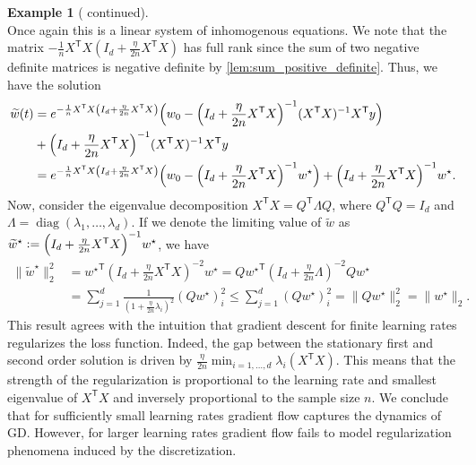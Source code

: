 \documentclass[12pt]{article}
\theoremstyle{definition}
\newtheorem{example}[example]{Example}
\numberwithin{equation}{section}
\newcommand{\T}{\mathsf{T}}
\newcommand{\norm}[1]{\lVert{#1}\rVert_2}
\newcommand{\defeq}{\vcentcolon=}
\DeclareMathOperator{\diag}{diag}
\begin{document}
\begin{example}[ continued]
\begin{equation*}
  \end{equation*}
  Once again this is a linear system of inhomogenous equations. We note that the matrix $-\frac{1}{n}X^\T X \left(I_d + \frac{\eta}{2n}X^\T X\right)$ has full rank since the sum of two negative definite matrices is negative definite by \autoref{lem:sum_positive_definite}. Thus, we have the solution
  \begin{align*}
    \widetilde{w}(t) &= e^{-\frac{1}{n}X^\T X \left(I_d + \frac{\eta}{2n}X^\T X\right)}\Bigl(w_0 - \Bigl(I_d +\frac{\eta}{2n}X^\T X \Bigr)^{-1}(X^\T X)^{-1}X^\T y\Bigr) \\
    &+ \Bigl(I_d +\frac{\eta}{2n}X^\T X \Bigr)^{-1}(X^\T X)^{-1}X^\T y \\
    &=e^{-\frac{1}{n}X^\T X \left(I_d + \frac{\eta}{2n}X^\T X\right)}\Bigl(w_0 - \Bigl(I_d +\frac{\eta}{2n}X^\T X \Bigr)^{-1}w^\star\Bigr) + \Bigl(I_d +\frac{\eta}{2n}X^\T X \Bigr)^{-1}w^\star.
  \end{align*}
  Now, consider the eigenvalue decomposition $X^\T X = Q^\T \Lambda Q$, where $Q^\T Q = I_d$ and $\Lambda = \diag(\lambda_1, \dots, \lambda_d)$. If we denote the limiting value of $\widetilde{w}$ as $\widetilde{w}^\star \defeq \Bigl(I_d +\frac{\eta}{2n}X^\T X \Bigr)^{-1}w^\star$, we have
  \begin{align*}
    \norm{\widetilde{w}^\star}^2 &= {w^\star}^\T (I_d + \frac{\eta}{2 n}X^\T X)^{-2} w^\star = {Qw^\star}^\T (I_d + \frac{\eta}{2 n}\Lambda)^{-2} Qw^\star \\
    &= \sum_{j=1}^d \frac{1}{(1 + \frac{\eta}{2 n}\lambda_i)^2} (Qw^\star)_i^2 \leq \sum_{j=1}^d (Qw^\star)_i^2 = \norm{Qw^\star}^2 = \norm{w^\star}.
  \end{align*}
  This result agrees with the intuition that gradient descent for finite learning rates regularizes the loss function. Indeed, the gap between the stationary first and second order solution is driven by $\frac{\eta}{2 n} \min_{i=1,\dots,d}\lambda_i(X^\T X)$. This means that the strength of the regularization is proportional to the learning rate and smallest eigenvalue of $X^\T X$ and inversely proportional to the sample size $n$. 
  We conclude that for sufficiently small learning rates gradient flow captures the dynamics of GD. However, for larger learning rates gradient flow fails to model regularization phenomena induced by the discretization.
\end{example}
\end{document}
